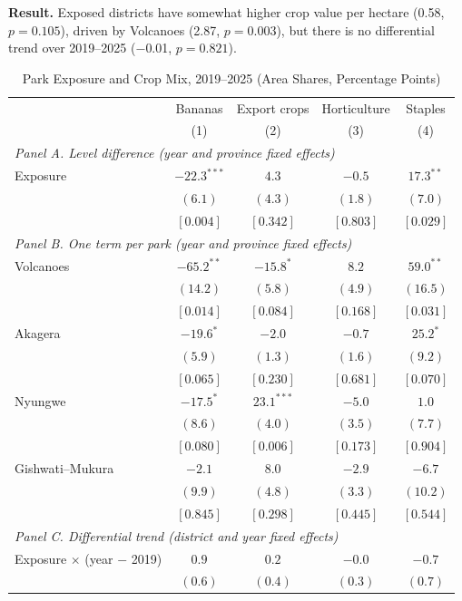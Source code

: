 \documentclass[11pt]{article}
\begin{document}
\textbf{Result.} Exposed districts have somewhat higher crop value per hectare (0.58, $p=0.105$), driven by Volcanoes (2.87, $p=0.003$), but there is no differential trend over 2019--2025 ($-$0.01, $p=0.821$).
\clearpage
\begin{table}[H]
\centering\small\setlength{\tabcolsep}{4pt}
\caption{Park Exposure and Crop Mix, 2019--2025 (Area Shares, Percentage Points)}
\label{tab:ag_mix}
\begin{tabular}{lcccc}
\toprule
 & Bananas & Export crops & Horticulture & Staples \\
 & (1) & (2) & (3) & (4) \\
\midrule
\multicolumn{5}{l}{\textit{Panel A. Level difference (year and province fixed effects)}} \\
Exposure & $-22.3^{***}$ & $4.3$ & $-0.5$ & $17.3^{**}$ \\
 & $(6.1)$ & $(4.3)$ & $(1.8)$ & $(7.0)$ \\
 & $[0.004]$ & $[0.342]$ & $[0.803]$ & $[0.029]$ \\
\multicolumn{5}{l}{\textit{Panel B. One term per park (year and province fixed effects)}} \\
Volcanoes & $-65.2^{**}$ & $-15.8^{*}$ & $8.2$ & $59.0^{**}$ \\
 & $(14.2)$ & $(5.8)$ & $(4.9)$ & $(16.5)$ \\
 & $[0.014]$ & $[0.084]$ & $[0.168]$ & $[0.031]$ \\
Akagera & $-19.6^{*}$ & $-2.0$ & $-0.7$ & $25.2^{*}$ \\
 & $(5.9)$ & $(1.3)$ & $(1.6)$ & $(9.2)$ \\
 & $[0.065]$ & $[0.230]$ & $[0.681]$ & $[0.070]$ \\
Nyungwe & $-17.5^{*}$ & $23.1^{***}$ & $-5.0$ & $1.0$ \\
 & $(8.6)$ & $(4.0)$ & $(3.5)$ & $(7.7)$ \\
 & $[0.080]$ & $[0.006]$ & $[0.173]$ & $[0.904]$ \\
Gishwati--Mukura & $-2.1$ & $8.0$ & $-2.9$ & $-6.7$ \\
 & $(9.9)$ & $(4.8)$ & $(3.3)$ & $(10.2)$ \\
 & $[0.845]$ & $[0.298]$ & $[0.445]$ & $[0.544]$ \\
\multicolumn{5}{l}{\textit{Panel C. Differential trend (district and year fixed effects)}} \\
Exposure $\times$ (year $-$ 2019) & $0.9$ & $0.2$ & $-0.0$ & $-0.7$ \\
 & $(0.6)$ & $(0.4)$ & $(0.3)$ & $(0.7)$ \\

\end{tabular}
\end{table}
\end{document}

